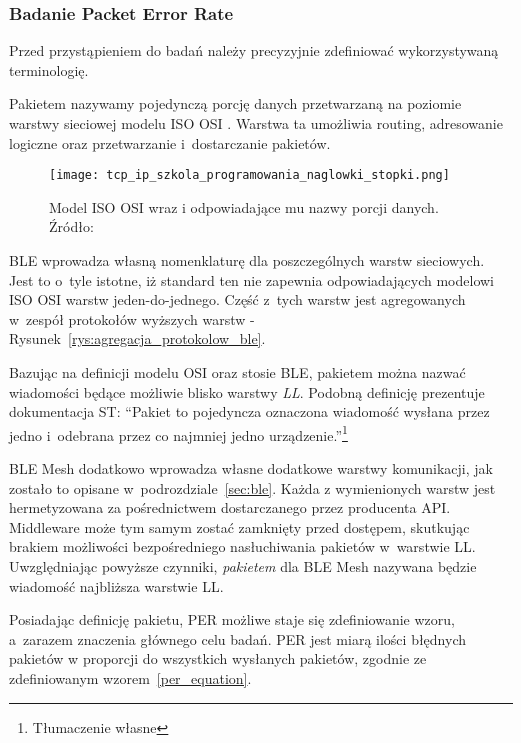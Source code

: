 \subsubsection{Badanie Packet Error Rate}\label{subsec:per_experiment}
Przed przystąpieniem do badań należy precyzyjnie zdefiniować wykorzystywaną terminologię.

Pakietem nazywamy pojedynczą porcję danych przetwarzaną na poziomie warstwy sieciowej modelu ISO OSI \cite{sa_tcpip_nodate}.
Warstwa ta umożliwia routing, adresowanie logiczne oraz przetwarzanie i~dostarczanie pakietów.

\begin{figure}[!ht]
	\centering \texttt{[image: tcp\_ip\_szkola\_programowania\_naglowki\_stopki.png]} 
	\caption{Model ISO OSI wraz i odpowiadające mu nazwy porcji danych. Źródło: \cite{sa_tcpip_nodate}}
	\label{rys:iso_osi_model_nazwy_grup_danych}
\end{figure}

\gls{BLE} wprowadza własną nomenklaturę dla poszczególnych warstw sieciowych. Jest to o~tyle istotne, iż standard ten
nie zapewnia odpowiadających modelowi ISO OSI warstw jeden-do-jednego. Część z~tych warstw jest agregowanych w~zespół 
protokołów wyższych warstw - Rysunek~\ref{rys:agregacja_protokolow_ble}. %

Bazując na definicji modelu OSI oraz stosie BLE, pakietem można nazwać wiadomości będące możliwie blisko
warstwy \textit{\gls{LL}}. Podobną definicję prezentuje dokumentacja ST:
\enquote{Pakiet to pojedyncza oznaczona wiadomość wysłana przez jedno i~odebrana przez 
co najmniej jedno urządzenie.}\footnote{Tłumaczenie własne}~\cite{stmicroelectronics_pm0271_2021}

BLE Mesh dodatkowo wprowadza własne dodatkowe warstwy komunikacji, jak zostało to opisane w~podrozdziale~\ref{sec:ble}.
Każda z wymienionych warstw jest hermetyzowana za pośrednictwem dostarczanego przez producenta \gls{API}.
Middleware może tym samym zostać zamknięty przed dostępem, skutkując brakiem możliwości 
bezpośredniego nasłuchiwania pakietów w~warstwie \gls{LL}. Uwzględniając powyższe czynniki, \textit{pakietem} dla BLE Mesh nazywana będzie wiadomość najbliższa warstwie \gls{LL}.

Posiadając definicję pakietu, \gls{PER} możliwe staje się zdefiniowanie wzoru, a~zarazem znaczenia
głównego celu badań. PER jest miarą ilości błędnych pakietów w proporcji do wszystkich wysłanych 
pakietów, zgodnie ze zdefiniowanym wzorem~\ref{per_equation}.

